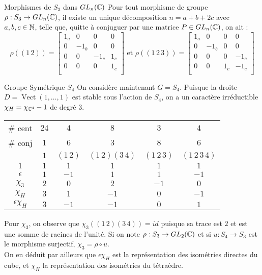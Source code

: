 \documentclass{cours}
\DeclareMathOperator{\Vect}{Vect}
\begin{document}
\begin{propositionfr}{Morphismes de $S_{3}$ dans $GL_{n}(\mathbb{C})$}{}
    Pour tout morphisme de groupe $\rho : S_{3} \to GL_{n}(\mathbb{C})$, il existe un unique décomposition $n = a + b + 2c$ avec $a, b, c \in \mathbb{N}$, telle que, quitte à conjuguer par une matrice $P \in GL_{n}(\mathbb{C})$, on ait :
    \[
        \rho((1\, 2)) = \begin{bmatrix}
            1_{a} & 0      & 0      & 0     \\
            0     & -1_{b} & 0      & 0     \\
            0     & 0      & -1_{c} & 1_{c} \\
            0     & 0      & 0      & 1_{c} \\
        \end{bmatrix}
        \text{ et }
        \rho ((1 \, 2 \, 3)) = \begin{bmatrix}
            1_{a} & 0      & 0     & 0      \\
            0     & -1_{b} & 0     & 0      \\
            0     & 0      & 0     & -1_{c} \\
            0     & 0      & 1_{c} & -1_{c} \\
        \end{bmatrix}
    \]
\end{propositionfr}

\begin{propositionfr}{Groupe Symétrique $S_{4}$}{}
    On considère maintenant $G = S_{4}$. Puisque la droite $D = \Vect (1, \ldots, 1)$ est stable sous l'action de $S_{4}$, on a un caractère irréductible $\chi_{H}  = \chi_{\mathbb{C}^{4}} - 1$ de degré $3$.
    \begin{center}
        \begin{tabular}{c|ccccc}
            \# cent & $24$ & $4$ & $8$ & $3$ & $4$\\
            \# conj & $1$ & $6$ & $3$ & $8$ & $6$\\
            & $1$ & $(1\, 2)$ & $(1\, 2)(3\, 4)$ & $(1\, 2 \, 3)$ & $(1\, 2\, 3\, 4)$\\
            \midrule
            $1$ & $1$ & $1$ & $1$ & $1$ & $1$\\
            $\epsilon$ & $1$ & $-1$ & $1$ & $1$ & $-1$\\
            $\chi_{3}$ & $2$ & $0$ & $2$ & $-1$ & $0$\\
            $\chi_{H}$ & $3$ & $1$ & $-1$ & $0$ & $-1$\\
            $\epsilon \chi_{H}$ & $3$ & $-1$ & $-1$ & $0$ & $1$
        \end{tabular}
    \end{center}
    Pour $\chi_{3}$, on observe que $\chi_{3}((1\, 2)(3\, 4)) = id$ puisque sa trace est $2$ et est une somme de racines de l'unité. Si on note $\rho : S_{3} \rightarrow GL_{2}(\mathbb{C})$ et si $u : S_{4} \rightarrow S_3$ est le morphisme surjectif, $\chi_{3} = \rho \circ u$. \\ On en déduit par ailleurs que $\epsilon\chi_{H}$ est la représentation des isométries directes du cube, et $\chi_{H}$ la représentation des isométries du tétraèdre.
\end{propositionfr}
\end{document}
